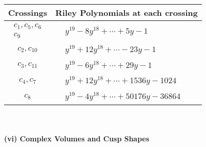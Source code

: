 \documentclass[1p]{elsarticle_modified}
\theoremstyle{definition}
\begin{document}
\begin{tabular}{m{50pt}|m{274pt}}
Crossings & \hspace{64pt}Riley Polynomials at each crossing \\
\hline $$\begin{aligned}c_{1},c_{5},c_{6}\\c_{9}\end{aligned}$$&$\begin{aligned}
&y^{19}-8 y^{18}+\cdots+5 y-1
\end{aligned}$\\
\hline $$\begin{aligned}c_{2},c_{10}\end{aligned}$$&$\begin{aligned}
&y^{19}+12 y^{18}+\cdots-23 y-1
\end{aligned}$\\
\hline $$\begin{aligned}c_{3},c_{11}\end{aligned}$$&$\begin{aligned}
&y^{19}-6 y^{18}+\cdots+29 y-1
\end{aligned}$\\
\hline $$\begin{aligned}c_{4},c_{7}\end{aligned}$$&$\begin{aligned}
&y^{19}+12 y^{18}+\cdots+1536 y-1024
\end{aligned}$\\
\hline $$\begin{aligned}c_{8}\end{aligned}$$&$\begin{aligned}
&y^{19}-4 y^{18}+\cdots+50176 y-36864
\end{aligned}$\\
\hline
\end{tabular}\\~\\
\newpage\flushleft \textbf{(vi) Complex Volumes and Cusp Shapes}
\end{document}
